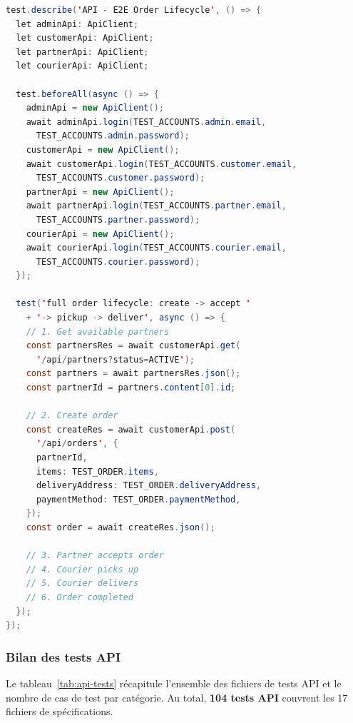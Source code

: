 \begin{lstlisting}[language=Java, caption={Test du cycle de vie complet -- e2e-order-flow.api.spec.ts}, label={lst:e2e-order-flow}]
test.describe('API - E2E Order Lifecycle', () => {
  let adminApi: ApiClient;
  let customerApi: ApiClient;
  let partnerApi: ApiClient;
  let courierApi: ApiClient;

  test.beforeAll(async () => {
    adminApi = new ApiClient();
    await adminApi.login(TEST_ACCOUNTS.admin.email,
      TEST_ACCOUNTS.admin.password);
    customerApi = new ApiClient();
    await customerApi.login(TEST_ACCOUNTS.customer.email,
      TEST_ACCOUNTS.customer.password);
    partnerApi = new ApiClient();
    await partnerApi.login(TEST_ACCOUNTS.partner.email,
      TEST_ACCOUNTS.partner.password);
    courierApi = new ApiClient();
    await courierApi.login(TEST_ACCOUNTS.courier.email,
      TEST_ACCOUNTS.courier.password);
  });

  test('full order lifecycle: create -> accept '
    + '-> pickup -> deliver', async () => {
    // 1. Get available partners
    const partnersRes = await customerApi.get(
      '/api/partners?status=ACTIVE');
    const partners = await partnersRes.json();
    const partnerId = partners.content[0].id;

    // 2. Create order
    const createRes = await customerApi.post(
      '/api/orders', {
      partnerId,
      items: TEST_ORDER.items,
      deliveryAddress: TEST_ORDER.deliveryAddress,
      paymentMethod: TEST_ORDER.paymentMethod,
    });
    const order = await createRes.json();

    // 3. Partner accepts order
    // 4. Courier picks up
    // 5. Courier delivers
    // 6. Order completed
  });
});
\end{lstlisting}

\subsubsection{Bilan des tests API}

Le tableau~\ref{tab:api-tests} récapitule l'ensemble des fichiers de tests API et le
nombre de cas de test par catégorie. Au total, \textbf{104 tests API} couvrent les
17 fichiers de spécifications.

